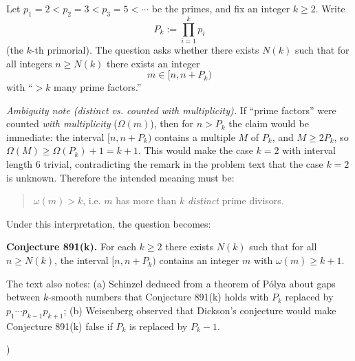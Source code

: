 \noindent Let $p_1=2<p_2=3<p_3=5<\cdots$ be the primes, and fix an integer $k\ge 2$. Write
\[
P_k := \prod_{i=1}^k p_i
\]
(the $k$-th primorial). The question asks whether there exists $N(k)$ such that for all integers $n\ge N(k)$ there exists an integer
\[
 m\in [n,n+P_k)
\]
with ``$>k$ many prime factors.''

\noindent \emph{Ambiguity note (distinct vs. counted with multiplicity).}
If ``prime factors'' were counted \emph{with multiplicity} ($\Omega(m)$), then for $n>P_k$ the claim would be immediate: the interval $[n,n+P_k)$ contains a multiple $M$ of $P_k$, and $M\ge 2P_k$, so $\Omega(M)\ge \Omega(P_k)+1 = k+1$. This would make the case $k=2$ with interval length $6$ trivial, contradicting the remark in the problem text that the case $k=2$ is unknown. Therefore the intended meaning must be:

\begin{quote}
$\omega(m)>k$, i.e. $m$ has more than $k$ \emph{distinct} prime divisors.
\end{quote}

\noindent Under this interpretation, the question becomes:

\noindent \textbf{Conjecture 891(k).} For each $k\ge 2$ there exists $N(k)$ such that for all $n\ge N(k)$, the interval $[n,n+P_k)$ contains an integer $m$ with $\omega(m)\ge k+1$.

\noindent The text also notes: (a) Schinzel deduced from a theorem of P\'olya about gaps between $k$-smooth numbers that Conjecture 891(k) holds with $P_k$ replaced by $p_1\cdots p_{k-1}p_{k+1}$; (b) Weisenberg observed that Dickson's conjecture would make Conjecture 891(k) false if $P_k$ is replaced by $P_k-1$.

)
